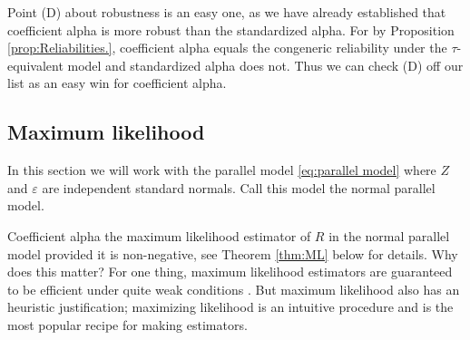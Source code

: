 \documentclass[twoside]{article}
\begin{document}
Point (D) about robustness is an easy one, as we have already established that coefficient alpha is more robust than the standardized alpha. For by Proposition \ref{prop:Reliabilities.}, coefficient alpha equals the congeneric reliability under the $\tau$-equivalent model and standardized alpha does not. Thus we can check (D) off our list as an easy win for coefficient alpha.

\subsection{Maximum likelihood}
In this section we will work with the parallel model \eqref{eq:parallel model} where $Z$ and $\varepsilon$ are independent standard normals. Call this model the normal parallel model.

Coefficient alpha the maximum likelihood estimator of $ R$ in the normal parallel model provided it is non-negative, see Theorem \ref{thm:ML} below for details. Why does this matter? For one thing, maximum likelihood estimators are guaranteed to be efficient under quite weak conditions \citep[][Section 7.3]{Lehmann2004-ke}. But maximum likelihood also has an heuristic justification; maximizing likelihood is an intuitive procedure and is the most popular recipe for making estimators.
\end{document}
